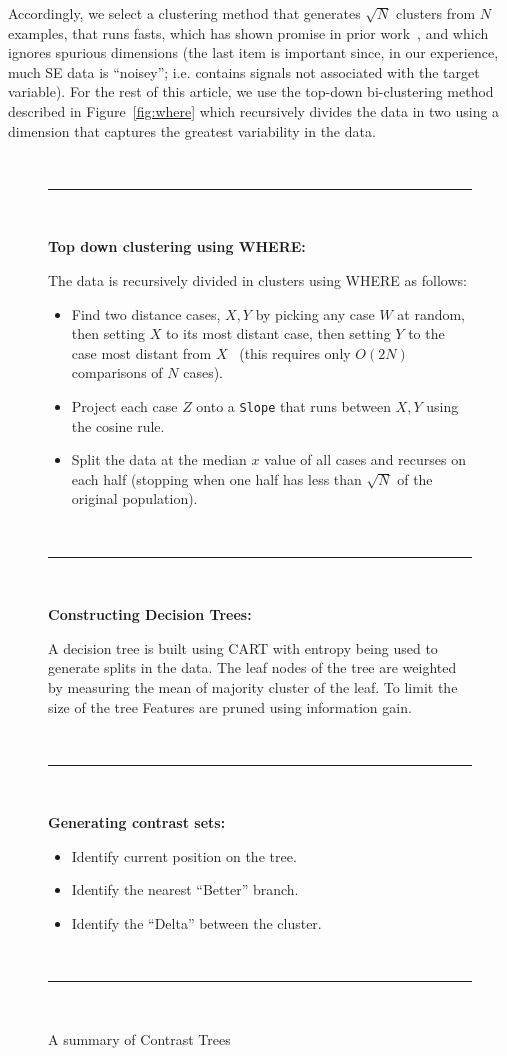 \documentclass[conference]{IEEEtran}
\newcommand{\fig}[1]{Figure~\ref{fig:#1}}
\begin{document}
	Accordingly, we select a clustering method that generates $\sqrt{N}$ clusters
	from $N$ examples, that runs fasts, which has shown promise in prior work~\cite{Menzies2013}, and which ignores spurious dimensions (the last item is important since, in our experience, much SE data is ``noisey''; i.e. contains signals not associated with the target variable). For the rest of this article,
	we use  the top-down
	bi-clustering method described in \fig{where} which recursively divides the
	data in two  using a dimension that captures the greatest variability in the data. 
	\begin{figure}[t]
		\small
		~\hrule~
		
		{\bf Top down clustering using WHERE:}
		
		The data is recursively divided in clusters using WHERE as follows:
		\begin{itemize}
			
			\item Find   two   distance cases,  $X,Y$
			by picking any case $W$ at random, then setting $X$ to its most
			distant case, then setting $Y$ to the case most distant from
			$X$~\cite{fastmap}
			(this requires only $O(2N)$ comparisons
			of $N$ cases).
			\item Project each case $Z$
			onto a {\tt Slope} that  runs between $X,Y$ using the cosine
			rule. 
			\item Split the data at the median $x$ value of all cases and
			recurses on each half  (stopping when
			one half has less  than $\sqrt{N}$ of the original population).
		\end{itemize}
		~\hrule~
		
		{\bf Constructing Decision Trees:}
		
		A decision tree is built using CART with entropy being used to generate splits in the data. The leaf nodes of the tree are weighted by measuring the mean of majority cluster of the leaf. To limit the size of the tree Features are pruned using information gain.
		
		~\hrule~
		
		{\bf Generating contrast sets:}
		\begin{itemize}
		\item Identify current position on the tree.
		\item Identify the nearest ``Better'' branch.
		\item Identify the ``Delta'' between the cluster.		
		\end{itemize}
		~\hrule~
		\caption{A summary of Contrast Trees}
		\label{fig:contast_trees}
	\end{figure}
	
\end{document}
